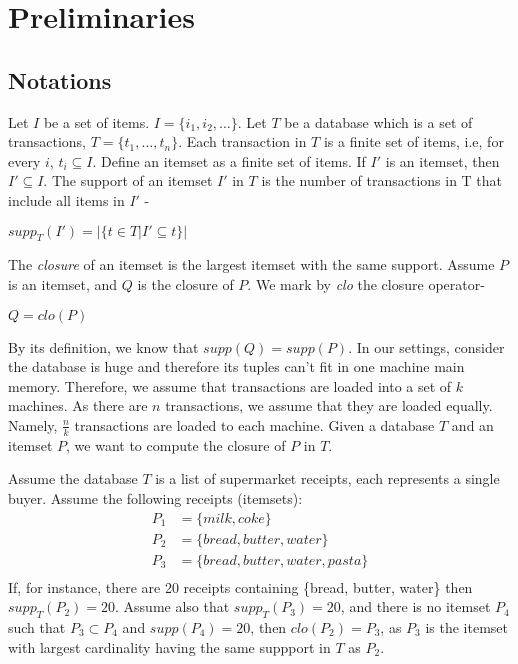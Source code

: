 \section{Preliminaries}

\subsection{Notations}
Let $I$ be a set of items. $I=\{i_1,i_2,\ldots\}$.
Let $T$ be a database which is a set of
transactions, $T=\{t_1,\ldots,t_n\}$.
Each transaction in $T$ is a finite set of items, i.e, for
every $i$, $t_i\subseteq I$. Define an itemset as a finite
set of items. If $I'$ is an itemset, then $I' \subseteq I$.
The support of an itemset $I'$ in $T$ is the number of
transactions in T that include all items in $I'$ - 
\begin{center}
$supp_T(I') = |\{ t \in T | I' \subseteq t \}|$
\end{center}
The \textit{closure} of an itemset is the largest itemset
with the same support. Assume $P$ is an itemset, and $Q$ is
the closure of $P$. We mark by \textit{clo} the closure
operator- 
\begin{center}
$Q=clo(P)$
\end{center}
By its definition, we know that $supp(Q)=supp(P)$. In our
settings, consider the database is huge and therefore its
tuples can't fit in one machine main memory. Therefore, we
assume that transactions are loaded into a set of $k$
machines. As there are $n$ transactions, we assume that they
are loaded equally. Namely, $\frac{n}{k}$ transactions are
loaded to each machine. Given a database $T$ and an itemset
$P$, we want to compute the closure of $P$ in $T$. 

\begin{example}
\label{example:basic}
Assume the database $T$ is a list of supermarket receipts, 
each represents a single buyer. Assume the following
receipts (itemsets):
\begin{align*}
P_1 &= \{milk, coke\} \\
P_2 &= \{bread, butter, water\} \\
P_3 &= \{bread, butter, water, pasta\} \\
\end{align*}
If, for instance, there are 20 receipts containing \{bread,
butter, water\} then $supp_T(P_2) = 20$. Assume also that
$supp_T(P_3) = 20$, and there is no itemset $P_4$ such that
$P_3 \subset P_4$ and $supp(P_4) = 20$, then $clo(P_2) =
P_3$, as $P_3$ is the itemset with largest cardinality
having the same suppport in $T$ as $P_2$.
\end{example}

